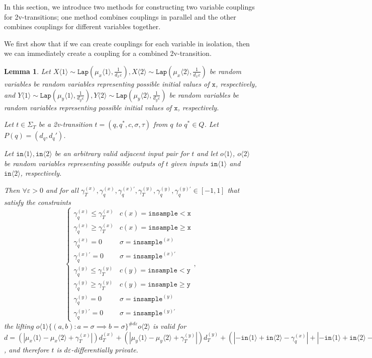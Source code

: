 \documentclass[12pt]{article}
\newcommand{\gguard}[1][x]{\texttt{insample}\geq#1}
\newcommand{\lguard}[1][x]{\texttt{insample} < #1}
\newcommand{\brangle}[1]{\langle#1 \rangle}
\newcommand{\Lap}{\texttt{Lap}}
\newtheorem{lemma}[thm]{Lemma}
\theoremstyle{definition}
\begin{document}
In this section, we introduce two methods for constructing two variable couplings for 2v-transitions; one method combines couplings in parallel and the other combines couplings for different variables together. 

We first show that if we can create couplings for each variable in isolation, then we can immediately create a coupling for a combined 2v-transition. 

\begin{lemma}\label{mvParallelCouplingsLemma}
    Let $X\brangle{1}\sim \Lap(\mu_x\brangle{1}, \frac{1}{d_x\varepsilon}), X\brangle{2}\sim\Lap(\mu_x\brangle{2}, \frac{1}{d_x\varepsilon})$ be random variables be random variables representing possible initial values of $\texttt{x}$, respectively, 
    and $Y\brangle{1}\sim \Lap(\mu_y\brangle{1}, \frac{1}{d_y\varepsilon}), Y\brangle{2}\sim\Lap(\mu_y\brangle{2}, \frac{1}{d_y\varepsilon})$ be random variables be random variables representing possible initial values of $\texttt{x}$, respectively. 

    Let $t\in \Sigma_T$ be a 2v-transition $t = (q, q^*, c, \sigma, \tau)$ from $q$ to $q^*\in Q$. Let $P(q) = (d_q, d_q')$.

    Let $\texttt{in}\brangle{1}, \texttt{in}\brangle{2}$ be an arbitrary valid adjacent input pair for $t$ and let $o\brangle{1}$, $o\brangle{2}$ be random variables representing possible outputs of $t$ given inputs $\texttt{in}\brangle{1}$ and $\texttt{in}\brangle{2}$, respectively. 

    Then $\forall \varepsilon>0$ and for all $\gamma_T^{(x)}, \gamma_q^{(x)}, \gamma_q^{(x)\prime},\gamma_T^{(y)}, \gamma_q^{(y)}, \gamma_q^{(y)\prime}\in [-1, 1]$ that satisfy the constraints \[
        \begin{cases}
          \gamma_q^{(x)}\leq\gamma_T^{(x)} & c(x) = \lguard[\texttt{x}]\\
          \gamma_q^{(x)}\geq\gamma_T^{(x)} & c(x) = \gguard[\texttt{x}]\\
          \gamma_q^{(x)}=0 & \sigma = \texttt{insample}^{(x)}\\
          \gamma_q^{(x)\prime}=0 & \sigma = \texttt{insample}^{(x)\prime}\\
          \gamma_q^{(y)}\leq\gamma_T^{(y)} & c(y) = \lguard[\texttt{y}]\\
          \gamma_q^{(y)}\geq\gamma_T^{(y)} & c(y) = \gguard[\texttt{y}]\\
          \gamma_q^{(y)}=0 & \sigma = \texttt{insample}^{(y)}\\
          \gamma_q^{(y)\prime}=0 & \sigma = \texttt{insample}^{(y)\prime}
        \end{cases},
      \]
      the lifting $o\brangle{1}\{(a, b): a=\sigma\implies b=\sigma\}^{\#d\varepsilon}o\brangle{2}$ is valid for 
      $d = (|\mu_x\brangle{1}-\mu_x\brangle{2}+\gamma_T^{(x)}|)d_T^{(x)}+(|\mu_y\brangle{1}-\mu_y\brangle{2}+\gamma_T^{(y)}|)d_T^{(y)}+(|-\texttt{in}\brangle{1}+\texttt{in}\brangle{2}-\gamma_q^{(x)}|+|-\texttt{in}\brangle{1}+\texttt{in}\brangle{2}-\gamma_q^{(y)}|)d_q+(|-\texttt{in}\brangle{1}+\texttt{in}\brangle{2}-\gamma_q^{(x)\prime}|+|-\texttt{in}\brangle{1}+\texttt{in}\brangle{2}-\gamma_q^{(y)\prime}|)d_q'$, and therefore $t$ is $d\varepsilon$-differentially private. 
\end{lemma}
\end{document}
